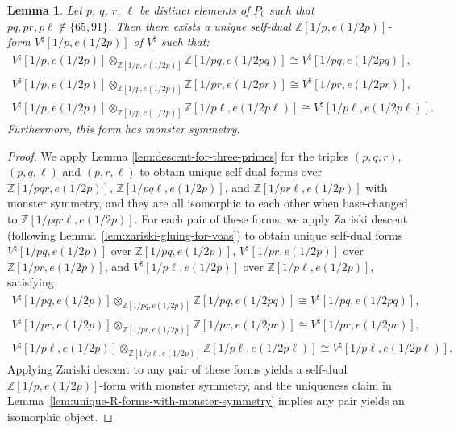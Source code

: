 \documentclass[pdftex]{sigma}
\newcommand{\bZ}{\mathbb{Z}}
\newtheorem{lem}[thm]{Lemma}
\theoremstyle{definition}
\begin{document}
\begin{lem} \label{lem:descent-for-tripod}Let $p$, $q$, $r$, $\ell$ be distinct elements of $P_0$ such that $pq, pr, p\ell \not\in \{65, 91\}$. Then there exists a unique self-dual $\bZ[1/p, e(1/2p)]$-form $V^\natural[1/p, e(1/2p)]$ of $V^\natural$ such that:{\samepage
\begin{gather*}
V^\natural[1/p, e(1/2p)] \otimes_{\bZ[1/p, e(1/2p)]} \bZ[1/pq, e(1/2pq)]\cong V^\natural[1/pq, e(1/2pq)], \\
V^\natural[1/p, e(1/2p)] \otimes_{\bZ[1/p, e(1/2p)]} \bZ[1/pr, e(1/2pr)]\cong V^\natural[1/pr, e(1/2pr)], \\
V^\natural[1/p, e(1/2p)] \otimes_{\bZ[1/p, e(1/2p)]} \bZ[1/p\ell, e(1/2p\ell)]\cong V^\natural[1/p\ell, e(1/2p\ell)].
\end{gather*}
Furthermore, this form has monster symmetry.}
\end{lem}
\begin{proof}We apply Lemma \ref{lem:descent-for-three-primes} for the triples $(p,q,r)$, $(p,q,\ell)$ and $(p,r,\ell)$ to obtain unique self-dual forms over $\bZ[1/pqr, e(1/2p)]$, $\bZ[1/pq\ell, e(1/2p)]$, and $\bZ[1/pr\ell, e(1/2p)]$ with monster symmetry, and they are all isomorphic to each other when base-changed to $\bZ[1/pqr\ell, e(1/2p)]$. For each pair of these forms, we apply Zariski descent (following Lemma~\ref{lem:zariski-gluing-for-voas}) to obtain unique self-dual forms $V^\natural[1/pq, e(1/2p)]$ over $\bZ[1/pq, e(1/2p)]$, $V^\natural[1/pr, e(1/2p)]$ over $\bZ[1/pr, e(1/2p)]$, and $V^\natural[1/p\ell, e(1/2p)]$ over $\bZ[1/p\ell, e(1/2p)]$, satisfying
\begin{gather*}
V^\natural[1/pq, e(1/2p)] \otimes_{\bZ[1/pq, e(1/2p)]} \bZ[1/pq, e(1/2pq)] \cong V^\natural[1/pq, e(1/2pq)], \\
V^\natural[1/pr, e(1/2p)] \otimes_{\bZ[1/pr, e(1/2p)]} \bZ[1/pr, e(1/2pr)]\cong V^\natural[1/pr, e(1/2pr)], \\
V^\natural[1/p\ell, e(1/2p)] \otimes_{\bZ[1/p\ell, e(1/2p)]} \bZ[1/p\ell, e(1/2p\ell)]\cong V^\natural[1/p\ell, e(1/2p\ell)].
\end{gather*}
Applying Zariski descent to any pair of these forms yields a self-dual $\bZ[1/p, e(1/2p)]$-form with monster symmetry, and the uniqueness claim in Lemma~\ref{lem:unique-R-forms-with-monster-symmetry} implies any pair yields an isomorphic object.
\end{proof}
\end{document}

